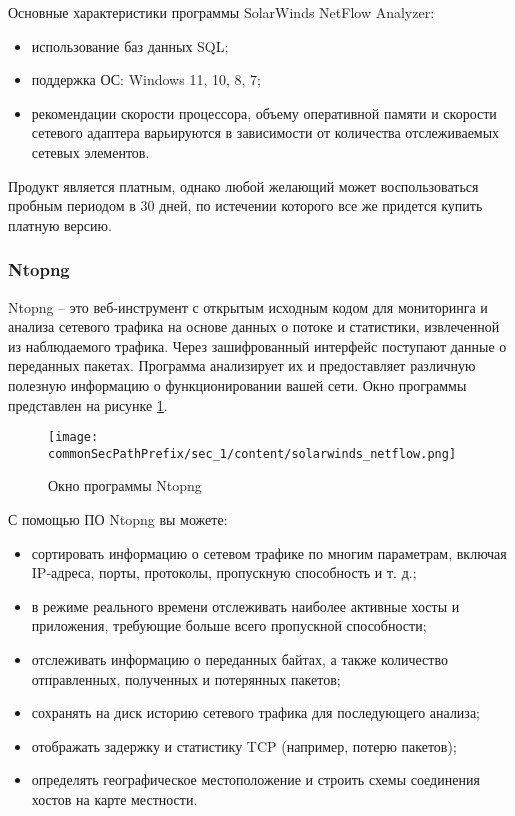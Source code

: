 Основные характеристики программы SolarWinds NetFlow Analyzer:
\begin{itemize}
    \item использование баз данных SQL;
    \item поддержка ОС: Windows 11, 10, 8, 7;
    \item рекомендации скорости процессора, объему оперативной памяти и
    скорости сетевого адаптера варьируются в зависимости от количества
    отслеживаемых сетевых элементов.
\end{itemize}

Продукт является платным, однако любой желающий может воспользоваться пробным 
периодом в 30 дней, по истечении которого все же придется купить платную версию.


\subsubsection{Ntopng}

Ntopng -- это веб-инструмент с открытым исходным кодом для
мониторинга и анализа сетевого трафика на основе данных о потоке и
статистики, извлеченной из наблюдаемого трафика. Через зашифрованный
интерфейс поступают данные о переданных пакетах. Программа анализирует их
и предоставляет различную полезную информацию о функционировании вашей
сети. Окно программы представлен на рисунке \ref{fig:ntopng}.

\begin{figure}[h!]
    \centering
    \texttt{[image: \\commonSecPathPrefix/sec\_1/content/solarwinds\_netflow.png]}
    \caption{Окно программы Ntopng}
    \label{fig:ntopng}
\end{figure}

С помощью ПО Ntopng вы можете:
\begin{itemize}
    \item сортировать информацию о сетевом трафике по многим параметрам,
    включая IP-адреса, порты, протоколы, пропускную способность и т. д.;
    \item в режиме реального времени отслеживать наиболее активные хосты и
    приложения, требующие больше всего пропускной способности;
    \item отслеживать информацию о переданных байтах, а также количество
    отправленных, полученных и потерянных пакетов;
    \item сохранять на диск историю сетевого трафика для последующего анализа;
    \item отображать задержку и статистику TCP (например, потерю пакетов);
    \item определять географическое местоположение и строить схемы соединения
    хостов на карте местности.
\end{itemize}


